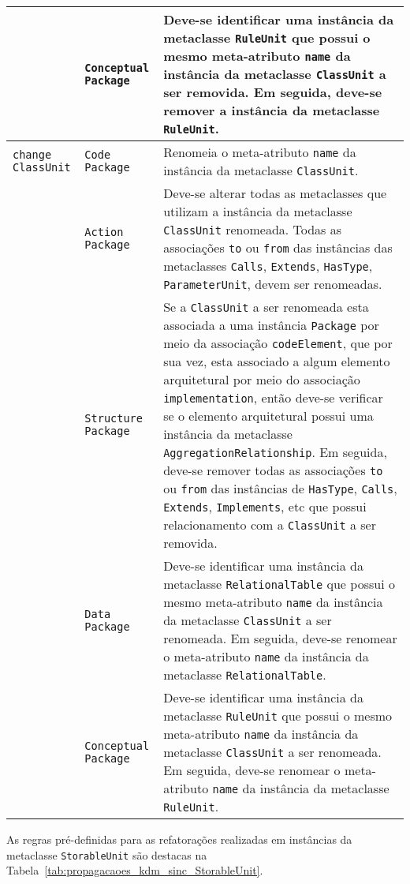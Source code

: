 \begin{longtable}{ | m{1.9cm} | m{3.57cm}| m{9.3cm} | }
\cline{2-3}
& \texttt{Conceptual Package} & Deve-se identificar uma instância da metaclasse \texttt{RuleUnit} que possui o mesmo meta-atributo \texttt{name} da instância da metaclasse \texttt{ClassUnit} a ser removida. Em seguida, deve-se remover a instância da metaclasse \texttt{RuleUnit}. \tabularnewline
\hline
\texttt{change} \texttt{ClassUnit} & \texttt{Code Package} & Renomeia o meta-atributo \texttt{name} da instância da metaclasse \texttt{ClassUnit}.\tabularnewline
\cline{2-3}
& \texttt{Action Package} & Deve-se alterar todas as metaclasses que utilizam a instância da metaclasse \texttt{ClassUnit} renomeada. Todas as associações \texttt{to} ou \texttt{from} das instâncias das metaclasses \texttt{Calls}, \texttt{Extends}, \texttt{HasType}, \texttt{ParameterUnit}, devem ser renomeadas. \tabularnewline
\cline{2-3}
& \texttt{Structure Package} & Se a \texttt{ClassUnit} a ser renomeada esta associada a uma instância \texttt{Package} por meio da associação \texttt{codeElement}, que por sua vez, esta associado a algum elemento arquitetural por meio do associação \texttt{implementation}, então deve-se verificar se o elemento arquitetural possui uma instância da metaclasse \texttt{AggregationRelationship}. Em seguida, deve-se remover todas as associações \texttt{to} ou \texttt{from} das instâncias de \texttt{HasType}, \texttt{Calls}, \texttt{Extends}, \texttt{Implements}, etc que possui relacionamento com a \texttt{ClassUnit} a ser removida. \tabularnewline
\cline{2-3}
& \texttt{Data Package} & Deve-se identificar uma instância da metaclasse \texttt{RelationalTable} que possui o mesmo meta-atributo \texttt{name} da instância da metaclasse \texttt{ClassUnit} a ser renomeada. Em seguida, deve-se renomear o meta-atributo \texttt{name} da instância da metaclasse \texttt{RelationalTable}. \tabularnewline
\cline{2-3}
& \texttt{Conceptual Package} & Deve-se identificar uma instância da metaclasse \texttt{RuleUnit} que possui o mesmo meta-atributo \texttt{name} da instância da metaclasse \texttt{ClassUnit} a ser renomeada. Em seguida, deve-se renomear o meta-atributo \texttt{name} da  instância da metaclasse \texttt{RuleUnit}. \tabularnewline
 \end{longtable}

As regras pré-definidas para as refatorações realizadas em instâncias da metaclasse \texttt{StorableUnit} são destacas na Tabela~\ref{tab:propagacaoes_kdm_sinc_StorableUnit}.


